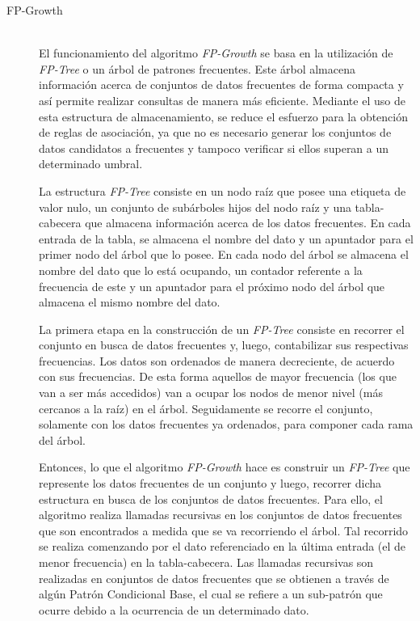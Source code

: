 \begin{enumerate}
\begin{description}
      \item[FP-Growth] \hfill \\
      El funcionamiento del algoritmo \textit{FP-Growth} se basa en la utilización de \textit{FP-Tree} o un árbol de patrones frecuentes. Este árbol almacena información acerca de conjuntos de datos frecuentes de forma compacta y así permite realizar consultas de manera más eficiente. Mediante el uso de esta estructura de almacenamiento, se reduce el esfuerzo para la obtención de reglas de asociación, ya que no es necesario generar los conjuntos de datos candidatos a frecuentes y tampoco verificar si ellos superan a un determinado umbral.
      
      La estructura \textit{FP-Tree} consiste en un nodo raíz que posee una etiqueta de valor nulo, un conjunto de subárboles hijos del nodo raíz y una tabla-cabecera que almacena información acerca de los datos frecuentes. En cada entrada de la tabla, se almacena el nombre del dato y un apuntador para el primer nodo del árbol que lo posee. En cada nodo del árbol se almacena el nombre del dato que lo está ocupando, un contador referente a la frecuencia de este  y un apuntador para el próximo nodo del árbol que almacena el mismo nombre del dato.
      
      La primera etapa en la construcción de un \textit{FP-Tree} consiste en recorrer el conjunto en busca de datos frecuentes y, luego, contabilizar sus respectivas frecuencias. Los datos son ordenados de manera decreciente, de acuerdo con sus frecuencias. De esta forma aquellos de mayor frecuencia (los que van a ser más accedidos) van a ocupar los nodos de menor nivel (más cercanos a la raíz) en el árbol. Seguidamente se recorre el conjunto, solamente con los datos frecuentes ya ordenados, para componer cada rama del árbol.
      
      Entonces, lo que el algoritmo \textit{FP-Growth} hace es construir un \textit{FP-Tree} que represente los datos frecuentes de un conjunto y luego, recorrer dicha estructura en busca de los conjuntos de datos frecuentes. Para ello, el algoritmo realiza llamadas recursivas en los conjuntos de datos frecuentes que son encontrados a medida que se va recorriendo el árbol. Tal recorrido se realiza comenzando por el dato referenciado en la última entrada (el de menor frecuencia) en la tabla-cabecera. Las llamadas recursivas son realizadas en conjuntos de datos frecuentes que se obtienen a través de algún Patrón Condicional Base, el cual se refiere a un sub-patrón que ocurre debido a la ocurrencia de un determinado dato.


\end{description}
\end{enumerate}
